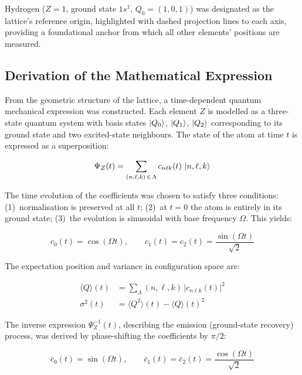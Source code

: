\documentclass[12pt, a4paper]{article}
\newcommand{\Lattice}{\Lambda}           %
\newcommand{\PsiF}{\Psi_{Z}}            %
\newcommand{\PsiI}{\Psi_{Z}^{-1}}       %
\begin{document}
Hydrogen ($Z=1$, ground state $1s^1$, $Q_0=(1,0,1)$) was designated as the lattice's
reference origin, highlighted with dashed projection lines to each axis, providing a
foundational anchor from which all other elements' positions are measured.

\subsection{Derivation of the Mathematical Expression}

From the geometric structure of the lattice, a time-dependent quantum mechanical
expression was constructed. Each element $Z$ is modelled as a three-state quantum system
with basis states $\ket{Q_0}$, $\ket{Q_1}$, $\ket{Q_2}$ corresponding to its ground state
and two excited-state neighbours. The state of the atom at time $t$ is expressed as a
superposition:

\begin{equation}
  \PsiF(t) = \sum_{(n,\ell,k)\,\in\,\Lattice} c_{n\ell k}(t)\,\ket{n, \ell, k}
  \label{eq:forward}
\end{equation}

The time evolution of the coefficients was chosen to satisfy three conditions:
(1)~normalisation is preserved at all $t$;
(2)~at $t=0$ the atom is entirely in its ground state;
(3)~the evolution is sinusoidal with base frequency $\Omega$. This yields:

\begin{equation}
  c_0(t) = \cos(\Omega t), \qquad
  c_1(t) = c_2(t) = \frac{\sin(\Omega t)}{\sqrt{2}}
  \label{eq:coeffs}
\end{equation}

The expectation position and variance in configuration space are:

\begin{align}
  \langle Q \rangle(t) &= \sum_{\Lattice} (n,\ell,k)\,|c_{n\ell k}(t)|^2
  \label{eq:expectation} \\[4pt]
  \sigma^2(t) &= \langle Q^2 \rangle(t) - \langle Q \rangle(t)^2
  \label{eq:variance}
\end{align}

The inverse expression $\PsiI(t)$, describing the emission (ground-state recovery)
process, was derived by phase-shifting the coefficients by $\pi/2$:

\begin{equation}
  \bar{c}_0(t) = \sin(\Omega t), \qquad
  \bar{c}_1(t) = \bar{c}_2(t) = \frac{\cos(\Omega t)}{\sqrt{2}}
  \label{eq:inv_coeffs}
\end{equation}
\end{document}
